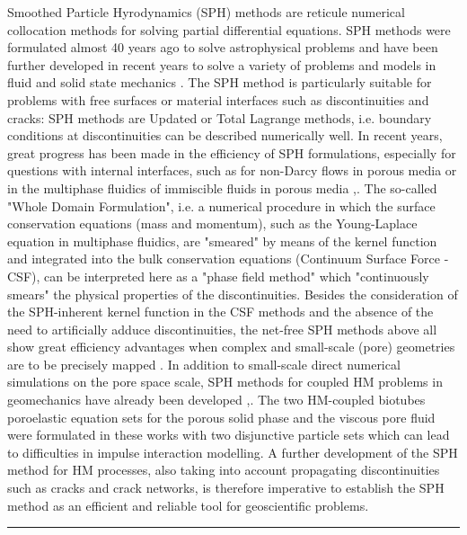 Smoothed Particle Hyrodynamics (SPH) methods are reticule numerical collocation methods for solving partial differential equations. SPH methods were formulated almost 40 years ago to solve astrophysical problems and have been further developed in recent years to solve a variety of problems and models in fluid and solid state mechanics \cite{Monaghan2011323}. The SPH method is particularly suitable for problems with free surfaces or material interfaces such as discontinuities and cracks: SPH methods are Updated or Total Lagrange methods, i.e. boundary conditions at discontinuities can be described numerically well. In recent years, great progress has been made in the efficiency of SPH formulations, especially for questions with internal interfaces, such as for non-Darcy flows in porous media or in the multiphase fluidics of immiscible fluids in porous media \cite{Morris2000333},\cite{Tartakovsky2005610}. The so-called "Whole Domain Formulation", i.e. a numerical procedure in which the surface conservation equations (mass and momentum), such as the Young-Laplace equation in multiphase fluidics, are "smeared" by means of the kernel function and integrated into the bulk conservation equations (Continuum Surface Force - CSF), can be interpreted here as a "phase field method" which "continuously smears" the physical properties of the discontinuities. Besides the consideration of the SPH-inherent kernel function in the CSF methods and the absence of the need to artificially adduce discontinuities, the net-free SPH methods above all show great efficiency advantages when complex and small-scale (pore) geometries are to be precisely mapped \cite{Sivanesapillai2016212}. In addition to small-scale direct numerical simulations on the pore space scale, SPH methods for coupled HM problems in geomechanics have already been developed \cite{Bui2007339},\cite{Bui20141321}. The two HM-coupled biotubes poroelastic equation sets for the porous solid phase and the viscous pore fluid were formulated in these works with two disjunctive particle sets which can lead to difficulties in impulse interaction modelling. A further development of the SPH method for HM processes, also taking into account propagating discontinuities such as cracks and crack networks, is therefore imperative to establish the SPH method as an efficient and reliable tool for geoscientific problems.

\bigskip
\hrule
\bigskip

